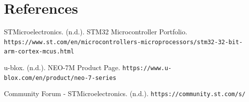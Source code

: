 \documentclass[conference]{IEEEtran}
\begin{document}
\section{References}
\begin{thebibliography}{1}
    STMicroelectronics. (n.d.). STM32 Microcontroller Portfolio.
    \texttt{https://www.st.com/en/microcontrollers-microprocessors/stm32-32-bit-arm-cortex-mcus.html}
    
    u-blox. (n.d.). NEO-7M Product Page.
    \texttt{https://www.u-blox.com/en/product/neo-7-series}
    
    Community Forum - STMicroelectronics. (n.d.).
    \texttt{https://community.st.com/s/}
\end{thebibliography}
\end{document}
